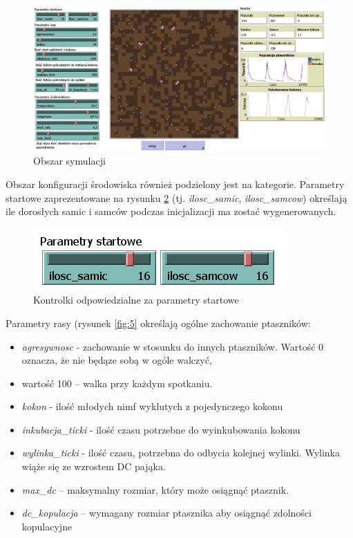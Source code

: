\documentclass[a4paper,11pt,titlepage]{article}
\begin{document}
\begin{figure}[H]
\centering
\includegraphics[width=1\columnwidth]{img/symulacja.PNG}
\caption{Obszar symulacji}
\label{fig:9}
\end{figure}

Obszar konfiguracji środowiska również podzielony jest na kategorie. Parametry startowe zaprezentowane na rysunku \ref{fig:6} (tj. \textit{ilosc\_samic}, \textit{ilosc\_samcow}) określają ile dorosłych samic i samców podczas inicjalizacji ma zostać wygenerowanych.

\begin{figure}[H]
\centering
\includegraphics[width=.5\columnwidth]{img/parametry_startowe.PNG}
\caption{Kontrolki odpowiedzialne za parametry startowe}
\label{fig:6}
\end{figure}

Parametry rasy (rysunek \ref{fig:5} określają ogólne zachowanie ptaszników:
\begin{itemize}
\item \textit{agresywnosc} - zachowanie w stosunku do innych ptaszników. Wartość 0 oznacza, że nie będąze sobą w ogóle walczyć, \item wartość 100 – walka przy każdym spotkaniu. 
\item \textit{kokon} - ilość młodych nimf wyklutych z pojedynczego kokonu 
\item \textit{inkubacja\_ticki} - ilość czasu potrzebne do wyinkubowania kokonu
\item \textit{wylinka\_ticki} - ilość czasu, potrzebna do odbycia kolejnej wylinki. Wylinka wiąże się ze wzrostem DC pająka. 
\item \textit{max\_dc} – maksymalny rozmiar, który może osiągnąć ptasznik. 
\item \textit{dc\_kopulacja} – wymagany rozmiar ptasznika aby osiągnąć zdolności kopulacyjne 
\end{itemize}
\end{document}
